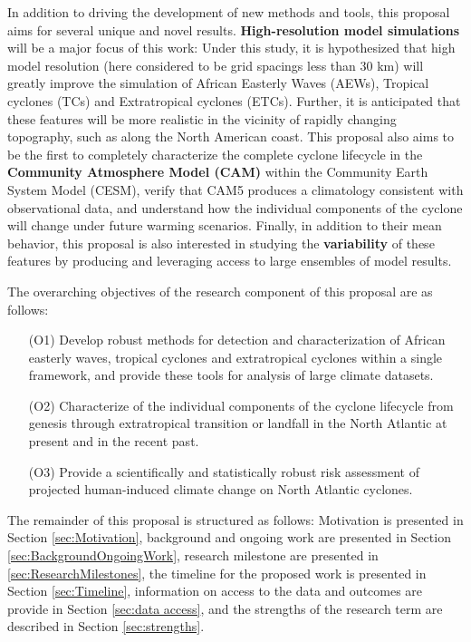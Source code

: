 \documentclass[11pt]{article}
\begin{document}
In addition to driving the development of new methods and tools, this proposal aims for several unique and novel results.  \textbf{High-resolution model simulations} will be a major focus of this work:  Under this study, it is hypothesized that high model resolution (here considered to be grid spacings less than 30 km) will greatly improve the simulation of African Easterly Waves (AEWs), Tropical cyclones (TCs) and Extratropical cyclones (ETCs).  Further, it is anticipated that these features will be more realistic in the vicinity of rapidly changing topography, such as along the North American coast.  This proposal also aims to be the first to completely characterize the complete cyclone lifecycle in the \textbf{Community Atmosphere Model (CAM)} within the Community Earth System Model (CESM), verify that CAM5 produces a climatology consistent with observational data, and understand how the individual components of the cyclone will change under future warming scenarios.  Finally, in addition to their mean behavior, this proposal is also interested in studying the \textbf{variability} of these features by producing and leveraging access to large ensembles of model results.

The overarching objectives of the research component of this proposal are as follows: 

\begin{enumerate}
\item[(O1)] Develop robust methods for detection and characterization of African easterly waves, tropical cyclones and extratropical cyclones within a single framework, and provide these tools for analysis of large climate datasets.

\item[(O2)] Characterize of the individual components of the cyclone lifecycle from genesis through extratropical transition or landfall in the North Atlantic at present and in the recent past.

\item[(O3)] Provide a scientifically and statistically robust risk assessment of projected human-induced climate change on North Atlantic cyclones.
\end{enumerate}

The remainder of this proposal is structured as follows: Motivation is presented in Section \ref{sec:Motivation}, background and ongoing work are presented in Section \ref{sec:BackgroundOngoingWork}, research milestone are presented in \ref{sec:ResearchMilestones}, the timeline for the proposed work is presented in Section \ref{sec:Timeline}, information on access to the data and outcomes are provide in Section \ref{sec:data access}, and the strengths of the research term are described in Section \ref{sec:strengths}.
\end{document}
